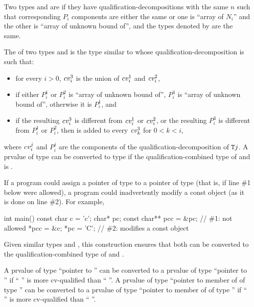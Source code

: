 \pnum
{}%
Two types  and  are  if
they have qualification-decompositions with the same $n$
such that corresponding $P_i$ components are either the same
or one is ``array of $N_i$'' and the other is ``array of unknown bound of'',
and the types denoted by  are the same.

\pnum
The  of two types  and 
is the type 
similar to  whose qualification-decomposition is such that:
\begin{itemize}
\item
for every $i > 0$, $\cv{}^3_i$ is the union of
$\cv{}^1_i$ and $\cv{}^2_i$,
\item
if either $P^1_i$ or $P^2_i$ is ``array of unknown bound of'',
$P^3_i$ is ``array of unknown bound of'', otherwise it is $P^1_i$, and
\item
if the resulting $\cv{}^3_i$ is different from $\cv{}^1_i$ or $\cv{}^2_i$,
or the resulting $P^3_i$ is different from $P^1_i$ or $P^2_i$,
then  is added to every $\cv{}^3_k$ for $0 < k < i$,
\end{itemize}
where $\cv{}^j_i$ and $P^j_i$ are the components of
the qualification-decomposition of $\texttt{\protect T}j$.
A prvalue of type 
can be converted to type 
if the qualification-combined type of  and  is .
\begin{note}
If a program could assign a pointer of type  to a pointer of
type   (that is, if line \#1 below were
allowed), a program could inadvertently modify a const object
(as it is done on line \#2). For example,
\begin{codeblock}
int main() {
  const char c = 'c';
  char* pc;
  const char** pcc = &pc;       // \#1: not allowed
  *pcc = &c;
  *pc = 'C';                    // \#2: modifies a const object
}
\end{codeblock}
\end{note}
\begin{note}
Given similar types  and , this
construction ensures that
both can be converted to the qualification-combined type of  and .
\end{note}

\pnum
\begin{note}
A prvalue of type ``pointer to  '' can be
converted to a prvalue of type ``pointer to  '' if
`` '' is more cv-qualified than ``
''.
A prvalue of type ``pointer to member of  of type 
'' can be converted to a prvalue of type ``pointer to member
of  of type  '' if ``
'' is more cv-qualified than `` ''.
\end{note}

